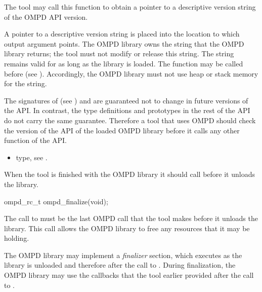 \descr
The tool may call this function to obtain a pointer to a descriptive 
version string of the OMPD API  version.

\argdesc
A pointer to a descriptive version string is placed into the location
to which  output argument points. The OMPD library owns the string 
that the OMPD library returns; the tool must not modify or release this string.
The string remains valid for as long as the library is loaded. The
 function may be called before 
 (see ).
Accordingly, the OMPD library must not use heap or stack memory for the string.

The signatures of  (see
) and  
are guaranteed not to change in future versions of the API. In contrast, the 
type definitions and prototypes in the rest of the API do not carry the same 
guarantee. Therefore a tool that uses OMPD should check the version of the API 
of the loaded OMPD library before it calls any other function of the API.

\crossreferences
\begin{itemize}
\item {} type, see .
\end{itemize}



\label{subsubsubsec:ompd_finalize}

\summary
When the tool is finished with the OMPD library it should call 
 before it unloads the library.

\format
\begin{cspecific}
\begin{ompSyntax}
ompd_rc_t ompd_finalize(void);
\end{ompSyntax}
\end{cspecific}

\descr
The call to  must be the last OMPD call that the tool 
makes before it unloads the library. This call allows the OMPD library to
free any resources that it may be holding.

The OMPD library may implement a \emph{finalizer} section, which executes
as the library is unloaded and therefore after the call to . 
During finalization, the OMPD library may use the callbacks that the tool earlier 
provided after the call to .

